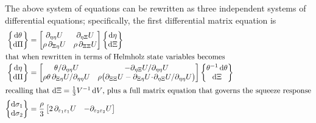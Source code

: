 The above system of equations can be rewritten as three independent systems of differential equations; specifically, the first differential matrix equation is
\begin{subequations}
    \label{hypoelastic3D}
    \begin{align}
    \left\{ \begin{matrix}
    \mathrm{d} \theta \\ \mathrm{d} \Pi
    \end{matrix} \right\} & = \begin{bmatrix}
    \partial_{\eta\eta} U & \partial_{\eta\Xi} U \\
    \rho \, \partial_{\Xi\eta} U & \rho \, \partial_{\Xi\Xi} U  
    \end{bmatrix}
    \left\{ \begin{matrix}
    \mathrm{d}\eta \\ \mathrm{d} \Xi 
    \end{matrix} \right\} \notag \\
    \intertext{that when rewritten in terms of Helmholz state variables becomes}
    \left\{ \begin{matrix}
    \mathrm{d} \eta \\ \mathrm{d} \Pi 
    \end{matrix} \right\} & = \begin{bmatrix}
    \theta / \partial_{\eta\eta} U & -\partial_{\eta\Xi} U / \partial_{\eta\eta} U \\ 
    \rho\theta \, \partial_{\Xi\eta} U / \partial_{\eta\eta} U & 
    \rho \bigl( \partial_{\Xi\Xi} U - \partial_{\Xi\eta} U \!\cdot\! \partial_{\eta\Xi} U / \partial_{\eta\eta} U \bigr)
    \end{bmatrix}
    \left\{ \begin{matrix}
    \theta^{-1} \, \mathrm{d} \theta \\ \mathrm{d} \Xi
    \end{matrix} \right\}
    \label{Helmholtz3Disotropic} \\
    \intertext{recalling that $\mathrm{d}\Xi = \tfrac{1}{3} V^{-1} \, \mathrm{d}V$, plus a full matrix equation that governs the squeeze response}
    \left\{ \begin{matrix}
    \mathrm{d} \sigma_1 \\ \mathrm{d} \sigma_2 
    \end{matrix} \right\} & = \frac{\rho}{3} \begin{bmatrix}
    2 \, \partial_{\varepsilon_1 \varepsilon_1} U & - \partial_{\varepsilon_2 \varepsilon_2} U \\

\end{bmatrix}
\end{align}
\end{subequations}
